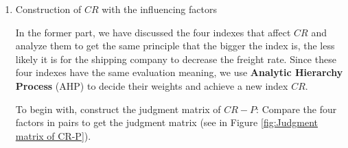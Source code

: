 \begin{enumerate}[\quad\bf1.]
\hspace{1em}
Fourth, we take the market demand into account. In the way similar to the operation on booking habits, we calculate the ratio between the market demand of the $i^{th}$ selling period $MD_i$ and the overall maximum market period $MD_max$. Then we get the current market demand through 
\begin{equation*}
    CMD_i = \frac{MD_i}{MD_max}
\end{equation*}


\item Construction of $CR$ with the influencing factors 

\hspace{1em}
In the former part, we have discussed the four indexes that affect $CR$ and analyze them to get the same principle that the bigger the index is, the less likely it is for the shipping company to decrease the freight rate. Since these four indexes have the same evaluation meaning, we use \textbf{Analytic Hierarchy Process} (AHP) to decide their weights and achieve a new index $CR$.

\hspace{1em}
To begin with, construct the judgment matrix of $CR-P$: Compare the four factors in pairs to get the judgment matrix (see in Figure \ref{fig:Judgment matrix of CR-P}).



\end{enumerate}
